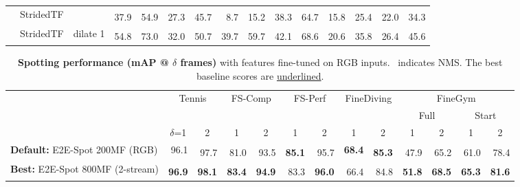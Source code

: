 \documentclass[runningheads]{llncs}
\newcommand{\OURMETHOD}{{E2E-Spot}\xspace}
\newcommand{\fscomp}{{FS-Comp}\xspace}
\newcommand{\fsperf}{{FS-Perf}\xspace}
\newcommand{\tennis}{{Tennis}\xspace}
\newcommand{\finegym}{{FineGym}\xspace}
\newcommand{\finediving}{{FineDiving}\xspace}
\newcommand{\best}[1]{\underline{#1}}
\newcommand{\sota}[1]{\textbf{#1}}
\newcommand{\nms}{\textsuperscript{\textdagger}}
\begin{document}
\begin{table*}[p]
{\begin{tabularx}{\textwidth}{lll
        rr
        rr
        rr
        rr
        rr
        rr
    }
        \cmidrule{2-15}
        & StridedTF &
            & \nms 37.9 & \nms 54.9 & \nms 27.3 & \nms 45.7 & \nms 8.7 & \nms 15.2 & \nms 38.3 & \nms 64.7 & \nms 15.8 & \nms 25.4 & \nms 22.0 & \nms 34.3 \\

        & StridedTF & dilate 1
            & \nms 54.8 & \nms 73.0 & \nms 32.0 & \nms 50.7 & \nms 39.7 & \nms 59.7 & \nms 42.1 & \nms 68.6 & \nms 20.6 & \nms 35.8 & \nms 26.4 & \nms 45.6 \\

        \bottomrule
    \end{tabularx}
    }
\end{table*}


\begin{table*}[p]
    \centering
    \caption{{\bf Spotting performance (mAP @ $\delta$ frames)} with features fine-tuned on RGB inputs.
    \textdagger~indicates NMS. The best baseline scores are \best{underlined}.
    }
    \label{tab:supp_full_fine_tuned}
    \vspace{0.5em}
    {
    \tiny
    \begin{tabularx}{\textwidth}{lll
        rr
        rr
        rr
        rr
        rr
        rr
    }
        \toprule
        &&
            & \multicolumn{2}{c}{\tennis}
            & \multicolumn{2}{c}{\fscomp}
            & \multicolumn{2}{c}{\fsperf}
            & \multicolumn{2}{c}{\finediving}
            & \multicolumn{4}{c}{\finegym}
            \\
        &&
            & \multicolumn{2}{c}{}
            & \multicolumn{2}{c}{}
            & \multicolumn{2}{c}{}
            & \multicolumn{2}{c}{}
            & \multicolumn{2}{c}{Full}
            & \multicolumn{2}{c}{Start}
            \\
        &&
            & \multicolumn{1}{c}{$\delta$=1}
            & \multicolumn{1}{c}{2}
            & \multicolumn{1}{c}{1}
            & \multicolumn{1}{c}{2}
            & \multicolumn{1}{c}{1}
            & \multicolumn{1}{c}{2}
            & \multicolumn{1}{c}{1}
            & \multicolumn{1}{c}{2}
            & \multicolumn{1}{c}{1}
            & \multicolumn{1}{c}{2}
            & \multicolumn{1}{c}{1}
            & \multicolumn{1}{c}{2}
            \\
        \midrule

        \multicolumn{3}{l}{{\bf Default:} \OURMETHOD 200MF (RGB)}
            & 96.1 & \nms 97.7
            & \nms 81.0 & \nms 93.5 & \nms \sota{85.1} & \nms 95.7 & \sota{68.4} & \nms \sota{85.3}
            & \nms 47.9 & \nms 65.2
            & \nms 61.0 & \nms 78.4
            \\
        \multicolumn{3}{l}{{\bf Best:} \OURMETHOD 800MF (2-stream)}
            & \nms \sota{96.9} & \nms \sota{98.1}
            & \nms \sota{83.4} & \nms \sota{94.9} & \nms 83.3 & \nms \sota{96.0} & \nms 66.4 & \nms 84.8
            & \nms \sota{51.8} & \nms \sota{68.5}
            & \nms \sota{65.3} & \nms \sota{81.6}
            \\


\end{tabularx}}
\end{table*}
\end{document}
